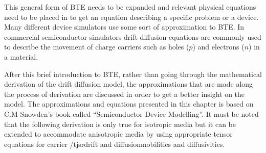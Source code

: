 \begin{doublespace}
This general form of BTE needs to be expanded and relevant physical equations need to be placed in to get an equation describing a specific problem or a device. 
Many different device simulators use some sort of approximation to  BTE. In commercial semiconductor simulators drift diffusion equations are commonly used to describe the movement of charge carriers such as holes ($p$) and electrons ($n$) in a material\cite{Comsol}\cite{SILVACO}\cite{LumDev}. 

After this brief introduction to  BTE, rather than going through the mathematical derivation of the drift diffusion model, the approximations that are made along the process of derivation are discussed in order to get a better insight on the model. The approximations and equations presented in this chapter is based on C.M Snowden's book called ``Semiconductor Device Modelling''\cite{snowden}. It must be noted that the following derivation is only true for isotropic media but it can be extended to accommodate anisotropic media by using appropriate tensor equations for carrier /tjsr{drift and diffusion}{mobilities and diffusivities}.


\end{doublespace}

